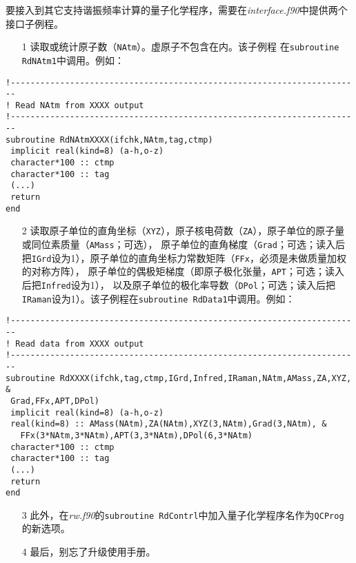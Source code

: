 \documentclass[12pt,a4paper,openany,twoside,cap,UTF8]{ctexbook}
\begin{document}
要接入到其它支持谐振频率计算的量子化学程序，需要在\emph{interface.f90}中提供两个接口子例程。
\begin{enumerate}
\item[1] 读取或统计原子数（\verb|NAtm|）。虚原子不包含在内。该子例程 在\verb|subroutine RdNAtm1|中调用。例如：
\end{enumerate}
\begin{colorboxed}[oval=false,boxcolor=blue!75!black,bgcolor=blue!5!white]
\begin{lstlisting}[language={[90]Fortran}]
!-----------------------------------------------------------------------
! Read NAtm from XXXX output
!-----------------------------------------------------------------------
subroutine RdNAtmXXXX(ifchk,NAtm,tag,ctmp)
 implicit real(kind=8) (a-h,o-z)
 character*100 :: ctmp
 character*100 :: tag
 (...)
 return
end
\end{lstlisting}\end{colorboxed}
\begin{enumerate}
\item[2] 读取原子单位的直角坐标（\verb|XYZ|），原子核电荷数（\verb|ZA|），原子单位的原子量或同位素质量（\verb|AMass|；可选），
  原子单位的直角梯度（\verb|Grad|；可选；读入后把\verb|IGrd|设为1），原子单位的直角坐标力常数矩阵（\verb|FFx|，必须是未做质量加权的对称方阵），
  原子单位的偶极矩梯度（即原子极化张量，\verb|APT|；可选；读入后把\verb|Infred|设为1），
  以及原子单位的极化率导数（\verb|DPol|；可选；读入后把\verb|IRaman|设为1）。该子例程在\verb|subroutine RdData1|中调用。例如：
\end{enumerate}
\begin{colorboxed}[oval=false,boxcolor=blue!75!black,bgcolor=blue!5!white]
\begin{lstlisting}[language={[90]Fortran}]
!-----------------------------------------------------------------------
! Read data from XXXX output
!-----------------------------------------------------------------------
subroutine RdXXXX(ifchk,tag,ctmp,IGrd,Infred,IRaman,NAtm,AMass,ZA,XYZ,  &
 Grad,FFx,APT,DPol)
 implicit real(kind=8) (a-h,o-z)
 real(kind=8) :: AMass(NAtm),ZA(NAtm),XYZ(3,NAtm),Grad(3,NAtm), &
   FFx(3*NAtm,3*NAtm),APT(3,3*NAtm),DPol(6,3*NAtm)
 character*100 :: ctmp
 character*100 :: tag
 (...)
 return
end
\end{lstlisting}\end{colorboxed}
\begin{enumerate}
\item[3] 此外，在\emph{rw.f90}的\verb|subroutine RdContrl|中加入量子化学程序名作为\verb|QCProg|的新选项。

\item[4] 最后，别忘了升级使用手册。
\end{enumerate}
\end{document}
